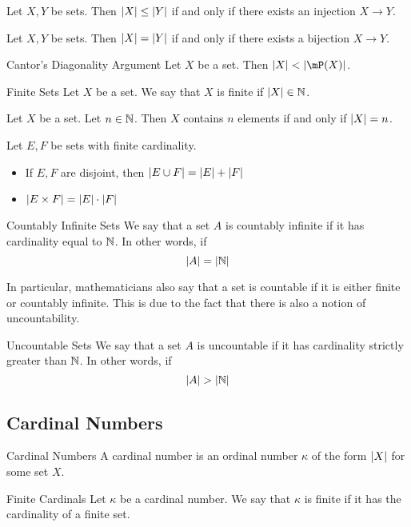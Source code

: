 \documentclass[a4paper]{article}
\begin{document}
\begin{prp}{}{} Let $X,Y$ be sets. Then $\abs{X}\leq\abs{Y}$ if and only if there exists an injection $X\to Y$. 
\end{prp}

\begin{prp}{}{} Let $X,Y$ be sets. Then $\abs{X}=\abs{Y}$ if and only if there exists a bijection $X\to Y$. 
\end{prp}

\begin{prp}{Cantor's Diagonality Argument}{} Let $X$ be a set. Then $\abs{X}<\abs{\mP(X)}$. 
\end{prp}

\begin{defn}{Finite Sets}{} Let $X$ be a set. We say that $X$ is finite if $\abs{X}\in\mathbb{N}$. 
\end{defn}

\begin{lmm}{}{} Let $X$ be a set. Let $n\in\mathbb{N}$. Then $X$ contains $n$ elements if and only if $\abs{X}=n$. 
\end{lmm}

\begin{prp}{}{} Let $E,F$ be sets with finite cardinality. 
\begin{itemize}
\item If $E,F$ are disjoint, then $\abs{E\cup F}=\abs{E}+\abs{F}$
\item $\abs{E\times F}=\abs{E}\cdot\abs{F}$
\end{itemize}
\end{prp}

\begin{defn}{Countably Infinite Sets}{} We say that a set $A$ is countably infinite if it has cardinality equal to $\mathbb{N}$. In other words, if $$\abs{A}=\abs{\mathbb{N}}$$
\end{defn}

In particular, mathematicians also say that a set is countable if it is either finite or countably infinite. This is due to the fact that there is also a notion of uncountability. 

\begin{defn}{Uncountable Sets}{} We say that a set $A$ is uncountable if it has cardinality strictly greater than $\mathbb{N}$. In other words, if $$\abs{A}>\abs{\mathbb{N}}$$
\end{defn}

\subsection{Cardinal Numbers}
\begin{defn}{Cardinal Numbers}{} A cardinal number is an ordinal number $\kappa$ of the form $\abs{X}$ for some set $X$. 
\end{defn}

\begin{defn}{Finite Cardinals}{} Let $\kappa$ be a cardinal number. We say that $\kappa$ is finite if it has the cardinality of a finite set. 
\end{defn}
 
\end{document}
